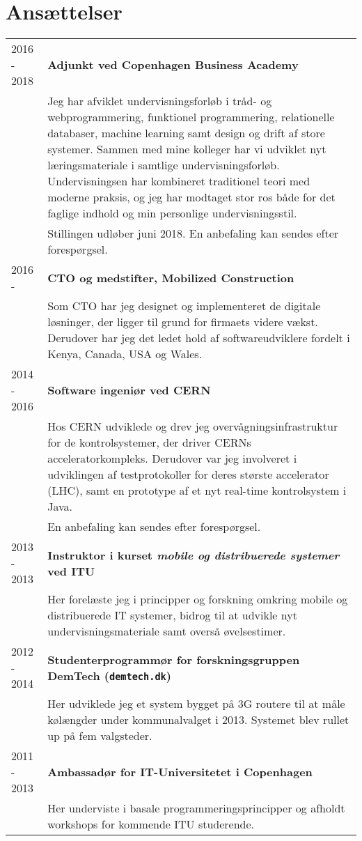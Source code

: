\documentclass[12pt,a4paper,notitlepage]{article}
\begin{document}
\section*{Ansættelser}
\begin{tabularx}{\textwidth}{l X}
2016 - 2018 & \textbf{Adjunkt ved Copenhagen Business Academy} \\
            & Jeg har afviklet undervisningsforløb i tråd- og webprogrammering,
              funktionel programmering, relationelle databaser, machine learning
              samt design og drift af store systemer. Sammen med mine kolleger
              har vi udviklet nyt læringsmateriale i samtlige undervisningsforløb.
              Undervisningsen har kombineret traditionel teori med
              moderne praksis, og jeg har modtaget stor ros både
              for det faglige indhold og min personlige undervisningsstil.\\
            & Stillingen udløber juni 2018.
              En anbefaling kan sendes efter forespørgsel. \\
2016 -      & \textbf{CTO og medstifter, Mobilized Construction} \\
            & Som CTO har
              jeg designet og implementeret de digitale løsninger, der ligger til
              grund for firmaets videre vækst. Derudover har jeg det ledet hold af
              softwareudviklere fordelt i Kenya, Canada, USA og Wales. \\
2014 - 2016 & \textbf{Software ingeniør ved CERN} \\
            & Hos CERN udviklede og drev jeg overvågningsinfrastruktur for
              de kontrolsystemer, der driver CERNs acceleratorkompleks.
              Derudover var jeg involveret i udviklingen af testprotokoller for
              deres største accelerator (LHC), samt en prototype af et nyt
              real-time kontrolsystem i Java. \\
            & En anbefaling kan sendes efter forespørgsel. \\
2013 - 2013 & \textbf{Instruktor i kurset \textit{mobile og distribuerede systemer} ved ITU} \\
            & Her forelæste jeg i principper og forskning omkring mobile og
              distribuerede IT systemer, bidrog til at udvikle nyt
              undervisningsmateriale samt overså øvelsestimer. \\
2012 - 2014 & \textbf{Studenterprogrammør for forskningsgruppen DemTech (\texttt{demtech.dk})} \\
            & Her udviklede jeg et system bygget på 3G routere til at måle
              kølængder under kommunalvalget i 2013. Systemet blev rullet up på
              fem valgsteder. \\
2011 - 2013 & \textbf{Ambassadør for IT-Universitetet i Copenhagen} \\
            & Her underviste i basale programmeringsprincipper og afholdt
              workshops for kommende ITU studerende.
\end{tabularx}
\end{document}
